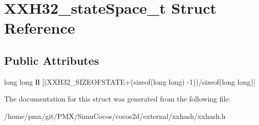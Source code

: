 \hypertarget{structXXH32__stateSpace__t}{}\section{X\+X\+H32\+\_\+state\+Space\+\_\+t Struct Reference}
\label{structXXH32__stateSpace__t}
\subsection*{Public Attributes}
\begin{DoxyCompactItemize}
\item 
\mbox{\label{structXXH32__stateSpace__t_a8e32b5f6cf7761e9635c5ad2be1dd20b}} 
long long {\bfseries ll} \mbox{[}(X\+X\+H32\+\_\+\+S\+I\+Z\+E\+O\+F\+S\+T\+A\+TE+(sizeof(long long) -\/1))/sizeof(long long)\mbox{]}
\end{DoxyCompactItemize}


The documentation for this struct was generated from the following file\+:\begin{DoxyCompactItemize}
\item 
/home/pmx/git/\+P\+M\+X/\+Simu\+Cocos/cocos2d/external/xxhash/xxhash.\+h\end{DoxyCompactItemize}
